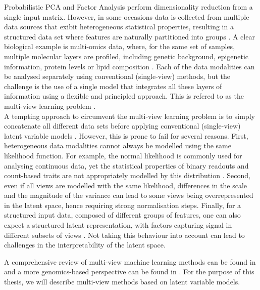 Probabilistic PCA and Factor Analysis perform dimensionality reduction from a single input matrix. However, in some occasions data is collected from multiple data sources that exibit heterogeneous statistical properties, resulting in a structured data set where features are naturally partitioned into groups \cite{Xu2013,Li2016,Zeng2018}. A clear biological example is multi-omics data, where, for the same set of samples, multiple molecular layers are profiled, including genetic background, epigenetic information, protein levels or lipid composition \cite{Huang2017b,Hasin2017b}. Each of the data modalities can be analysed separately using conventional (single-view) methods, but the challenge is the use of a single model that integrates all these layers of information using a flexible and principled approach. This is refered to as the multi-view learning problem \cite{Xu2013,Li2016}.\\
A tempting approach to circumvent the multi-view learning problem is to simply concatenate all different data sets before applying conventional (single-view) latent variable models \cite{Ritchie2015}. However, this is prone to fail for several reasons. First, heterogeneous data modalities cannot always be modelled using the same likelihood function. For example, the normal likelihood is commonly used for analysing continuous data, yet the statistical properties of binary readouts and count-based traits are not appropriately modelled by this distribution \cite{Pilling2018}. Second, even if all views are modelled with the same likelihood, differences in the scale and the magnitude of the variance can lead to some views being overrepresented in the latent space, hence requiring strong normalisation steps. Finally, for a structured input data, composed of different groups of features, one can also expect a structured latent representation, with factors capturing signal in different subsets of views \cite{Virtanen2012,Klami2015}. Not taking this behaviour into account can lead to challenges in the interpretability of the latent space.

A comprehensive review of multi-view machine learning methods can be found in \cite{Xu2013} and a more genomics-based perspective can be found in \cite{Ritchie2015}. For the purpose of this thesis, we will describe multi-view methods based on latent variable models.

